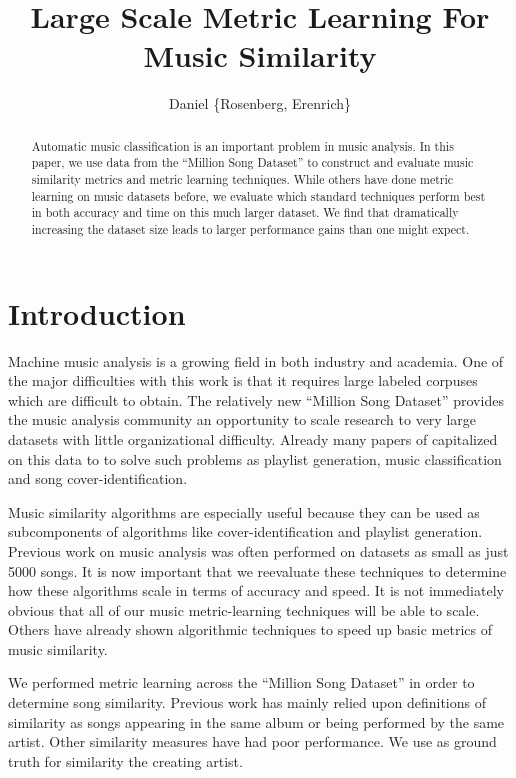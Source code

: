 \documentclass[a4paper,10pt]{article}
\title{Large Scale Metric Learning For Music Similarity}
\author{Daniel \{Rosenberg, Erenrich\} }
\begin{document}
\maketitle

\begin{abstract}
Automatic music classification is an important problem in music analysis. In this paper, we use data from the ``Million Song Dataset'' to construct and evaluate music similarity metrics and metric learning techniques. While others have done metric learning on music datasets before, we evaluate which standard techniques perform best in both accuracy and time on this much larger dataset. We find that dramatically increasing the dataset size leads to larger performance gains than one might expect.
\end{abstract}

\section{Introduction}
Machine music analysis is a growing field in both industry and academia. One of the major difficulties with this work is that it requires large labeled corpuses which are difficult to obtain. The relatively new ``Million Song Dataset'' provides the music analysis community an opportunity to scale research to very large datasets with little organizational difficulty\cite{Bertin-Mahieux2011}. Already many papers of capitalized on this data to to solve such problems as playlist generation\cite{mcfee2011_nlp}, music classification and song cover-identification\cite{Bertin-Mahieux2011b}. 

Music similarity algorithms are especially useful because they can be used as subcomponents of algorithms like cover-identification and playlist generation. Previous work on music analysis was often performed on datasets as small as just 5000 songs\cite{Slaney_learninga}. It is now important that we reevaluate these techniques to determine how these algorithms scale in terms of accuracy and speed. It is not immediately obvious that all of our music metric-learning techniques will be able to scale. Others have already shown algorithmic techniques to speed up basic metrics of music similarity\cite{mcfee2011_sim}.

We performed metric learning across the ``Million Song Dataset'' in order to determine song similarity. Previous work has mainly relied upon definitions of similarity as songs appearing in the same album or being performed by the same artist. Other similarity measures have had poor performance. We use as ground truth for similarity the creating artist.
\end{document}
